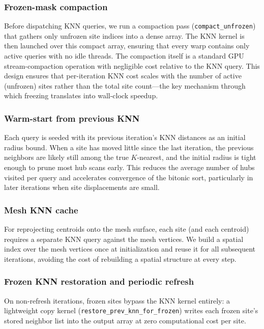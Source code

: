 \subsubsection{Frozen-mask compaction}

Before dispatching KNN queries, we run a compaction pass (\texttt{compact\_unfrozen}) that gathers only unfrozen site indices into a dense array. The KNN kernel is then launched over this compact array, ensuring that every warp contains only active queries with no idle threads. The compaction itself is a standard GPU stream-compaction operation with negligible cost relative to the KNN query. This design ensures that per-iteration KNN cost scales with the number of active (unfrozen) sites rather than the total site count---the key mechanism through which freezing translates into wall-clock speedup.

\subsubsection{Warm-start from previous KNN}

Each query is seeded with its previous iteration's KNN distances as an initial radius bound. When a site has moved little since the last iteration, the previous neighbors are likely still among the true $K$-nearest, and the initial radius is tight enough to prune most hub scans early. This reduces the average number of hubs visited per query and accelerates convergence of the bitonic sort, particularly in later iterations when site displacements are small.

\subsubsection{Mesh KNN cache}

For reprojecting centroids onto the mesh surface, each site (and each centroid) requires a separate KNN query against the mesh vertices. We build a spatial index over the mesh vertices once at initialization and reuse it for all subsequent iterations, avoiding the cost of rebuilding a spatial structure at every step.

\subsubsection{Frozen KNN restoration and periodic refresh}

On non-refresh iterations, frozen sites bypass the KNN kernel entirely: a lightweight copy kernel (\texttt{restore\_prev\_knn\_for\_frozen}) writes each frozen site's stored neighbor list into the output array at zero computational cost per site.

